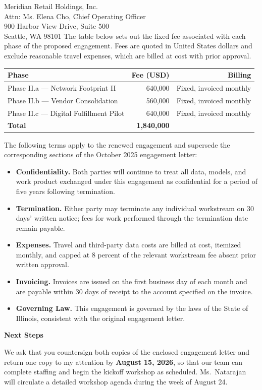\documentclass[a4paper,11pt,oneside,foldmarks,rightdate]{akletter}
\newcommand{\vxsection}[1]{%
  \par\vspace{10pt}\noindent
  {\color{vxnavy}\bfseries\fontsize{11}{13}\selectfont #1}\par
  \vspace{2pt}\noindent{\color{vxgold}\rule{\linewidth}{0.7pt}}\par
  \vspace{6pt}}
\begin{document}
\begin{letter}{Meridian Retail Holdings, Inc.\\Attn: Ms. Elena Cho, Chief Operating Officer\\900 Harbor View Drive, Suite 500\\Seattle, WA 98101}
The table below sets out the fixed fee associated with each phase of the proposed engagement. Fees are quoted in United States dollars and exclude reasonable travel expenses, which are billed at cost with prior approval.

\begin{tabularx}{\linewidth}{@{}X r r@{}}
\toprule
\textbf{Phase} & \textbf{Fee (USD)} & \textbf{Billing}\\
\midrule
Phase II.a --- Network Footprint II & 640,000 & Fixed, invoiced monthly\\
Phase II.b --- Vendor Consolidation & 560,000 & Fixed, invoiced monthly\\
Phase II.c --- Digital Fulfillment Pilot & 640,000 & Fixed, invoiced monthly\\
\midrule
\textbf{Total} & \textbf{1,840,000} & \\
\bottomrule
\end{tabularx}

\vspace{6pt}
The following terms apply to the renewed engagement and supersede the corresponding sections of the October 2025 engagement letter:

\begin{itemize}[leftmargin=14pt, itemsep=4pt, topsep=4pt]
\item \textbf{Confidentiality.} Both parties will continue to treat all data, models, and work product exchanged under this engagement as confidential for a period of five years following termination.
\item \textbf{Termination.} Either party may terminate any individual workstream on 30 days' written notice; fees for work performed through the termination date remain payable.
\item \textbf{Expenses.} Travel and third-party data costs are billed at cost, itemized monthly, and capped at 8 percent of the relevant workstream fee absent prior written approval.
\item \textbf{Invoicing.} Invoices are issued on the first business day of each month and are payable within 30 days of receipt to the account specified on the invoice.
\item \textbf{Governing Law.} This engagement is governed by the laws of the State of Illinois, consistent with the original engagement letter.
\end{itemize}

\vxsection{Next Steps}

We ask that you countersign both copies of the enclosed engagement letter and return one copy to my attention by \textbf{August 15, 2026}, so that our team can complete staffing and begin the kickoff workshop as scheduled. Ms.\ Natarajan will circulate a detailed workshop agenda during the week of August 24.


\end{letter}
\end{document}
